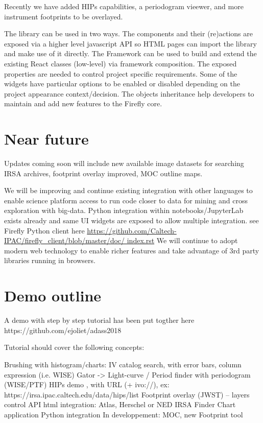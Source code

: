\documentclass[11pt,twoside]{article}
\begin{document}
Recently we have added HIPs capabilities, a periodogram vieewer, and more instrument footprints to be overlayed.

The library can be used in two ways. The components and their (re)actions are exposed via a higher level javascript API so HTML pages can import the library and make use of it directly.
The Framework can be used to build and extend the existing React classes (low-level) via framework composition. The exposed properties are needed to control project specific requirements. Some of the widgets have particular options to be enabled or disabled depending on the project appearance context/decision. The objects inheritance help developers to maintain and add new features to the Firefly core.


\section{Near future}

Updates coming soon will include new available image datasets for searching IRSA archives, footprint overlay improved, MOC outline maps.

We will be improving and continue existing integration with other languages to enable science platform access to run code closer to data for mining and cross exploration with big-data.
Python integration within notebooks/JupyterLab exists already and same UI widgets are exposed to allow multiple integration. see Firefly Python client here {\url{https://github.com/Caltech-IPAC/firefly_client/blob/master/doc/ index.rst}}
We will continue to adopt modern web technology to enable richer features and take advantage of 3rd party libraries running in browsers.



\section{Demo outline}

A demo with step by step tutorial has been put togther here https://github.com/ejoliet/adass2018

Tutorial should cover the following concepts:

Brushing with histogram/charts: IV catalog search, with error bars, column expression (i.e. WISE)
Gator -> Light-curve / Period finder with periodogram (WISE/PTF)
HIPs demo , with URL (+ ivo://), ex: https://irsa.ipac.caltech.edu/data/hips/list
Footprint overlay (JWST) – layers control
API html integration: Atlas, Herschel or NED
IRSA Finder Chart application
Python integration
In developpement: MOC, new Footprint tool
\end{document}
